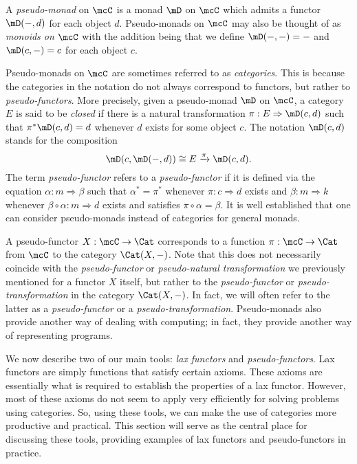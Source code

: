 \documentclass[a4paper,reqno,oneside]{article}
\begin{document}
A \textit{pseudo-monad} on $\mcC$ is a monad $\mD$ on $\mcC$ which admits a functor $\mD(-,d)$ for each object $d$. Pseudo-monads on $\mcC$ may also be thought of as \textit{monoids on $\mcC$} with the addition being that we define $\mD(-,-) = -$ and $\mD(c,-) = c$ for each object $c$.

Pseudo-monads on $\mcC$ are sometimes referred to as \textit{categories}. This is because the categories in the notation do not always correspond to functors, but rather to \textit{pseudo-functors}. More precisely, given a pseudo-monad $\mD$ on $\mcC$, a category $E$ is said to be \textit{closed} if there is a natural transformation $\pi : E \Rightarrow \mD(c,d)$ such that $\pi^*\mD(c,d) = d$ whenever $d$ exists for some object $c$. The notation $\mD(c,d)$ stands for the composition
\[
	\mD(c,\mD(-,d)) \cong E \xrightarrow{\pi} \mD(c,d).
\]
The term \textit{pseudo-functor} refers to a \textit{pseudo-functor} if it is defined via the equation $\alpha : m \Rightarrow \beta$ such that $\alpha^* = \pi^\ast$ whenever $\pi : c \Rightarrow d$ exists and $\beta : m \Rightarrow k$ whenever $\beta \circ \alpha : m \Rightarrow d$ exists and satisfies $\pi \circ \alpha = \beta$. It is well established that one can consider pseudo-monads instead of categories for general monads.

A pseudo-functor $X : \mcC \to \Cat$ corresponds to a function $\pi : \mcC \to \Cat$ from $\mcC$ to the category $\Cat(X,-)$. Note that this does not necessarily coincide with the \textit{pseudo-functor} or \textit{pseudo-natural transformation} we previously mentioned for a functor $X$ itself, but rather to the \textit{pseudo-functor} or \textit{pseudo-transformation} in the category $\Cat(X,-)$. In fact, we will often refer to the latter as a \textit{pseudo-functor} or a \textit{pseudo-transformation}. Pseudo-monads also provide another way of dealing with computing; in fact, they provide another way of representing programs.

We now describe two of our main tools: \textit{lax functors} and \textit{pseudo-functors}. Lax functors are simply functions that satisfy certain axioms. These axioms are essentially what is required to establish the properties of a lax functor. However, most of these axioms do not seem to apply very efficiently for solving problems using categories. So, using these tools, we can make the use of categories more productive and practical. This section will serve as the central place for discussing these tools, providing examples of lax functors and pseudo-functors in practice.
\end{document}
